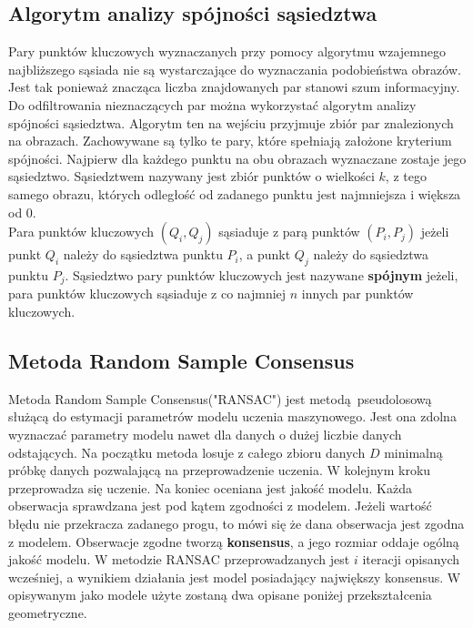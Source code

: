 \documentclass{article}
\begin{document}
	\subsection{Algorytm analizy spójności sąsiedztwa}
	Pary punktów kluczowych wyznaczanych przy pomocy algorytmu wzajemnego najbliższego sąsiada nie są wystarczające do wyznaczania podobieństwa obrazów. Jest tak ponieważ znacząca liczba znajdowanych par stanowi szum informacyjny.\\
	Do odfiltrowania nieznaczących par można wykorzystać algorytm analizy spójności sąsiedztwa. Algorytm ten na wejściu przyjmuje zbiór par znalezionych na obrazach. Zachowywane są  tylko te pary, które spełniają założone kryterium spójności.
	Najpierw dla każdego punktu na obu obrazach wyznaczane zostaje jego sąsiedztwo. Sąsiedztwem nazywany jest zbiór punktów o wielkości $k$, z tego samego obrazu, których odległość od zadanego punktu jest najmniejsza i większa od 0.\\
	Para punktów kluczowych $(Q_i, Q_j)$ sąsiaduje z parą punktów $(P_i, P_j)$ jeżeli punkt $Q_i$ należy do sąsiedztwa punktu $P_i$, a punkt $Q_j$ należy do sąsiedztwa punktu $P_j$.
	Sąsiedztwo pary punktów kluczowych jest nazywane \textbf{spójnym} jeżeli, para punktów kluczowych sąsiaduje z co najmniej $n$ innych par punktów kluczowych.
	\subsection{Metoda Random Sample Consensus}
	Metoda Random Sample Consensus("RANSAC") jest metodą pseudolosową służącą do estymacji parametrów modelu uczenia maszynowego. Jest ona zdolna wyznaczać parametry modelu nawet dla danych o dużej liczbie danych odstających.
	Na początku metoda losuje z całego zbioru danych $D$ minimalną próbkę danych pozwalającą na przeprowadzenie uczenia. W kolejnym kroku przeprowadza się uczenie. Na koniec oceniana jest jakość modelu. Każda obserwacja sprawdzana jest pod kątem zgodności z modelem. Jeżeli wartość błędu nie przekracza zadanego progu, to mówi się że dana obserwacja jest zgodna z modelem. Obserwacje zgodne tworzą \textbf{konsensus}, a jego rozmiar oddaje ogólną jakość modelu. W metodzie RANSAC przeprowadzanych jest $i$ iteracji opisanych wcześniej, a wynikiem działania jest model posiadający największy konsensus. W opisywanym jako modele użyte zostaną dwa opisane poniżej przekształcenia geometryczne.
\end{document}
